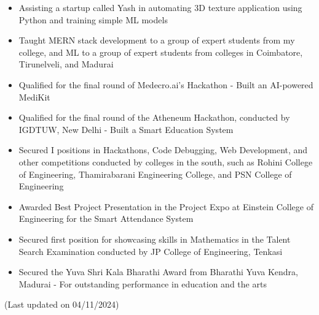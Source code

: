 \documentclass[letterpaper,11pt]{article}
\newcommand{\resheading}[1]{\textbf{\sffamily{\mbox{~}{\large #1} \vphantom{p\^{E}}}}}
\begin{document}
\resheading{Achievements/Activities}
\vspace{-3mm}
\begin{itemize}
    \item Assisting a startup called Yash in automating 3D texture application using Python and training simple ML models
    \vspace{-3mm}
    \item Taught MERN stack development to a group of expert students from my college, and ML to a group of expert students from colleges in Coimbatore, Tirunelveli, and Madurai
    \vspace{-3mm}
    \item Qualified for the final round of Medecro.ai's Hackathon - Built an AI-powered MediKit
    \vspace{-3mm}
    \item Qualified for the final round of the Atheneum Hackathon, conducted by IGDTUW, New Delhi - Built a Smart Education System
    \vspace{-3mm}
    \item Secured I positions in Hackathons, Code Debugging, Web Development, and other competitions conducted by colleges in the south, such as Rohini College of Engineering, Thamirabarani Engineering College, and PSN College of Engineering
    \vspace{-3mm}
    \item Awarded Best Project Presentation in the Project Expo at Einstein College of Engineering for the Smart Attendance System
    \vspace{-3mm}
    \item Secured first position for showcasing skills in Mathematics in the Talent Search Examination conducted by JP College of Engineering, Tenkasi
    \vspace{-3mm}
    \item Secured the Yuva Shri Kala Bharathi Award from Bharathi Yuva Kendra, Madurai - For outstanding performance in education and the arts
\end{itemize}
\vspace{2cm}
(Last updated on 04/11/2024)
\end{document}
